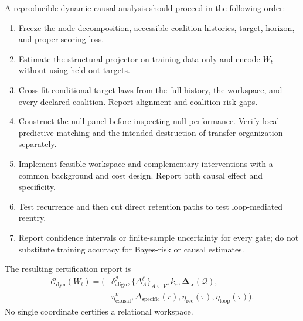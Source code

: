 A reproducible dynamic-causal analysis should proceed in the following order:
\begin{enumerate}
\item Freeze the node decomposition, accessible coalition histories, target,
 horizon, and proper scoring loss.
\item Estimate the structural projector on training data only and encode
 \(W_t\) without using held-out targets.
\item Cross-fit conditional target laws from the full history, the workspace,
 and every declared coalition. Report alignment and coalition risk gaps.
\item Construct the null panel before inspecting null performance. Verify
 local-predictive matching and the intended destruction of transfer
 organization separately.
\item Implement feasible workspace and complementary interventions with a
 common background and cost design. Report both causal effect and
 specificity.
\item Test recurrence and then cut direct retention paths to test loop-mediated
 reentry.
\item Report confidence intervals or finite-sample uncertainty for every gate;
 do not substitute training accuracy for Bayes-risk or causal estimates.
\end{enumerate}

The resulting certification report is
\[
\boxed{
\begin{aligned}
\mathcal C_{\mathrm{dyn}}(W_t)
=\bigl(&
\delta_{\mathrm{align}}^{\mathcal I},
\{\Delta_A^\ell\}_{A\subseteq V},
 k_\varepsilon,
\boldsymbol\Delta_{\mathrm{tr}}(\mathcal Q),\\
&\eta_{\mathrm{causal}}^\nu,
\Delta_{\mathrm{specific}}(r),
\eta_{\mathrm{rec}}(\tau),
\eta_{\mathrm{loop}}(\tau)
\bigr).
\end{aligned}
}
\]
No single coordinate certifies a relational workspace.
